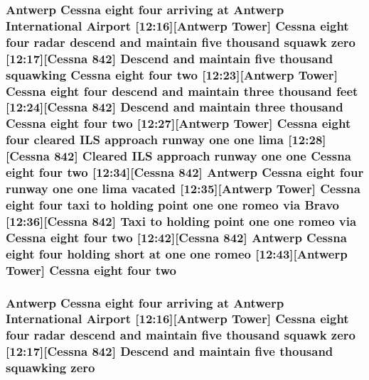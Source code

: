 \subsubsection[{\texorpdfstring{two}{two}}]{\setlength{\rightskip}{0pt plus 5cm}Antwerp {\bf Cessna} eight four arriving at Antwerp International {\bf Airport} \mbox{[}12\+:16\mbox{]}\mbox{[}Antwerp {\bf Tower}\mbox{]} {\bf Cessna} eight four radar descend and maintain five {\bf thousand} squawk {\bf zero} \mbox{[}12\+:17\mbox{]}\mbox{[}{\bf Cessna} 842\mbox{]} Descend and maintain five {\bf thousand} {\bf squawking} {\bf Cessna} eight four two \mbox{[}12\+:23\mbox{]}\mbox{[}Antwerp {\bf Tower}\mbox{]} {\bf Cessna} eight four descend and maintain three {\bf thousand} {\bf feet} \mbox{[}12\+:24\mbox{]}\mbox{[}{\bf Cessna} 842\mbox{]} Descend and maintain three {\bf thousand} {\bf Cessna} eight four two \mbox{[}12\+:27\mbox{]}\mbox{[}Antwerp {\bf Tower}\mbox{]} {\bf Cessna} eight four cleared I\+LS approach runway {\bf one} {\bf one} {\bf lima} \mbox{[}12\+:28\mbox{]}\mbox{[}{\bf Cessna} 842\mbox{]} Cleared I\+LS approach runway {\bf one} {\bf one} {\bf Cessna} eight four two \mbox{[}12\+:34\mbox{]}\mbox{[}{\bf Cessna} 842\mbox{]} Antwerp {\bf Cessna} eight four runway {\bf one} {\bf one} {\bf lima} vacated \mbox{[}12\+:35\mbox{]}\mbox{[}Antwerp {\bf Tower}\mbox{]} {\bf Cessna} eight four taxi to holding point {\bf one} {\bf one} {\bf romeo} via {\bf Bravo} \mbox{[}12\+:36\mbox{]}\mbox{[}{\bf Cessna} 842\mbox{]} Taxi to holding point {\bf one} {\bf one} {\bf romeo} via {\bf Cessna} eight four two \mbox{[}12\+:42\mbox{]}\mbox{[}{\bf Cessna} 842\mbox{]} Antwerp {\bf Cessna} eight four holding short at {\bf one} {\bf one} {\bf romeo} \mbox{[}12\+:43\mbox{]}\mbox{[}Antwerp {\bf Tower}\mbox{]} {\bf Cessna} eight four two}\hypertarget{happyDay2ATC_8txt_a8cad909be335793c9a2bc86d42edc8a5}{}\label{happyDay2ATC_8txt_a8cad909be335793c9a2bc86d42edc8a5}
\subsubsection[{\texorpdfstring{zero}{zero}}]{\setlength{\rightskip}{0pt plus 5cm}Antwerp {\bf Cessna} eight four arriving at Antwerp International {\bf Airport} \mbox{[}12\+:16\mbox{]}\mbox{[}Antwerp {\bf Tower}\mbox{]} {\bf Cessna} eight four radar descend and maintain five {\bf thousand} squawk zero \mbox{[}12\+:17\mbox{]}\mbox{[}{\bf Cessna} 842\mbox{]} Descend and maintain five {\bf thousand} {\bf squawking} zero}\hypertarget{happyDay2ATC_8txt_adce466d7618784129bcb0feb6d2d98e4}{}\label{happyDay2ATC_8txt_adce466d7618784129bcb0feb6d2d98e4}
